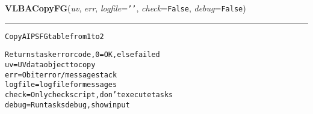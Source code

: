     \label{VLBACal:VLBACopyFG}
    \vspace{0.5ex}

    \begin{boxedminipage}{\textwidth}

    \raggedright \textbf{VLBACopyFG}(\textit{uv}, \textit{err}, \textit{logfile}=\texttt{'\-'\-}, \textit{check}=\texttt{F\-a\-l\-s\-e\-}, \textit{debug}=\texttt{F\-a\-l\-s\-e\-})

    \vspace{-1.5ex}

    \rule{\textwidth}{0.5\fboxrule}
\begin{alltt}
Copy AIPS FG table from 1 to 2

Returns task error code, 0=OK, else failed
uv       = UV data object to copy
err      = Obit error/message stack
logfile  = logfile for messages
check    = Only check script, don't execute tasks
debug    = Run tasks debug, show input\end{alltt}

    \vspace{1ex}

    \end{boxedminipage}

    \label{VLBACal:VLBADelayCal}
    \vspace{0.5ex}

